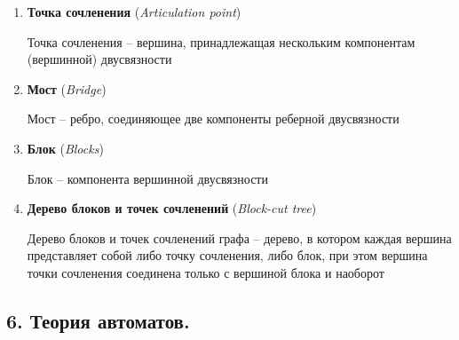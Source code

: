 \documentclass[12pt]{article}
\begin{document}
\begin{enumerate}
        Реберная двусвязность определяется как отношение эквивалентности 2 вершины, между которыми существуют 2 реберно-различных пути

        Компонента реберной двусвязности -- подграф, который включает все двусвязные вершины (класс эквивалентности двусвязности).

        \item \textbf{Точка сочленения} (\textit{Articulation point})

        Точка сочленения -- вершина, принадлежащая нескольким компонентам (вершинной) двусвязности

        \item \textbf{Мост} (\textit{Bridge})

        Мост -- ребро, соединяющее две компоненты реберной двусвязности

        \item \textbf{Блок} (\textit{Blocks})

        Блок -- компонента вершинной двусвязности

        \item \textbf{Дерево блоков и точек сочленений} (\textit{Block-cut tree})

        Дерево блоков и точек сочленений графа -- дерево, в котором каждая вершина представляет собой либо точку сочленения, либо блок,
        при этом вершина точки сочленения соединена только с вершиной блока и наоборот


    \end{enumerate}

    \subsection{6. Теория автоматов.}
\end{document}
